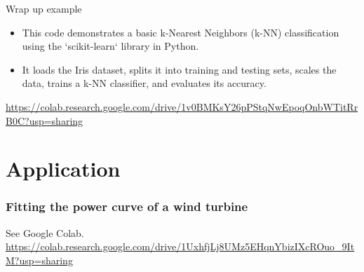 \begin{frame} {Wrap up example}

  \begin{itemize}
    \item   This code demonstrates a basic k-Nearest Neighbors (k-NN) classification using the `scikit-learn` library in Python.
    \item   It loads the Iris dataset, splits it into training and testing sets, scales the data, trains a k-NN classifier, and evaluates its accuracy.
  \end{itemize}
  \url{https://colab.research.google.com/drive/1v0BMKsY26pPStqNwEpoqOnbWTitRrB0C?usp=sharing}
  
%
%
%
%
%
%
%

\end{frame}
  


\section{Application}

\begin{frame}
  \frametitle{Fitting the power curve of a wind turbine}

  See Google Colab.
  \url{https://colab.research.google.com/drive/1UxhfjLj8UMz5EHqnYbizIXcROuo_9ItM?usp=sharing}
\end{frame}
 